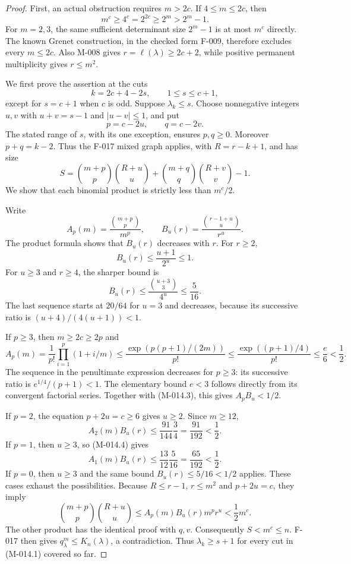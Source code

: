 \begin{proof}
First, an actual obstruction requires \(m>2c\).
If \(4\leq m\leq2c\), then
\[
          m^c\geq4^c=2^{2c}\geq2^m>2^m-1.
\]
For \(m=2,3\), the same sufficient determinant size
\(2^m-1\) is at most \(m^c\) directly. The known
Grenet construction, in the checked form F-009, therefore
excludes every \(m\leq2c\). Also M-008 gives
\(r=\ell(\lambda)\geq2c+2\), while positive permanent
multiplicity gives \(r\leq m^2\).

We first prove the assertion at the cuts
\[
              k=2c+4-2s,\qquad 1\leq s\leq c+1,
                                                               \tag{M-014.1}
\]
except for \(s=c+1\) when \(c\) is odd. Suppose
\(\lambda_k\leq s\). Choose nonnegative integers
\(u,v\) with \(u+v=s-1\) and \(|u-v|\leq1\),
and put
\[
                      p=c-2u,\qquad q=c-2v.
\]
The stated range of \(s\), with its one exception,
ensures \(p,q\geq0\). Moreover \(p+q=k-2\).
Thus the F-017 mixed graph applies, with
\(R=r-k+1\), and has size
\[
 S=\binom{m+p}{p}\binom{R+u}{u}
      +\binom{m+q}{q}\binom{R+v}{v}-1.                 \tag{M-014.2}
\]
We show that each binomial product is strictly less than
\(m^c/2\).

Write
\[
 A_p(m)=\frac{\binom{m+p}{p}}{m^p},\qquad
 B_u(r)=\frac{\binom{r-1+u}{u}}{r^u}.
\]
The product formula shows that \(B_u(r)\) decreases
with \(r\). For \(r\geq2\),
\[
              B_u(r)\leq\frac{u+1}{2^u}\leq1.
                                                               \tag{M-014.3}
\]
For \(u\geq3\) and \(r\geq4\), the sharper bound is
\[
              B_u(r)\leq\frac{\binom{u+3}{3}}{4^u}
                                      \leq\frac5{16}.
                                                               \tag{M-014.4}
\]
The last sequence starts at \(20/64\) for \(u=3\)
and decreases, because its successive ratio is
\((u+4)/(4(u+1))<1\).

If \(p\geq3\), then \(m\geq2c\geq2p\) and
\[
 A_p(m)=\frac1{p!}\prod_{i=1}^p(1+i/m)
       \leq\frac{\exp(p(p+1)/(2m))}{p!}
       \leq\frac{\exp((p+1)/4)}{p!}
       \leq\frac e6<\frac12.
\]
The sequence in the penultimate expression decreases for
\(p\geq3\): its successive ratio is
\(e^{1/4}/(p+1)<1\). The elementary bound \(e<3\)
follows directly from its convergent factorial series.
Together with (M-014.3), this gives \(A_pB_u<1/2\).

If \(p=2\), the equation \(p+2u=c\geq6\) gives
\(u\geq2\). Since \(m\geq12\),
\[
 A_2(m)B_u(r)\leq\frac{91}{144}\frac34
                                      =\frac{91}{192}<\frac12.
\]
If \(p=1\), then \(u\geq3\), so (M-014.4) gives
\[
 A_1(m)B_u(r)\leq\frac{13}{12}\frac5{16}
                                      =\frac{65}{192}<\frac12.
\]
If \(p=0\), then \(u\geq3\) and the same bound
\(B_u(r)\leq5/16<1/2\) applies. These cases exhaust
the possibilities. Because \(R\leq r-1\), \(r\leq m^2\)
and \(p+2u=c\), they imply
\[
 \binom{m+p}{p}\binom{R+u}{u}
            \leq A_p(m)B_u(r)m^p r^u<\frac12m^c.
\]
The other product has the identical proof with \(q,v\).
Consequently \(S<m^c\leq n\). F-017 then gives
\(q^m_\lambda\leq K_n(\lambda)\), a contradiction.
Thus \(\lambda_k\geq s+1\) for every cut in
(M-014.1) covered so far.


\end{proof}
